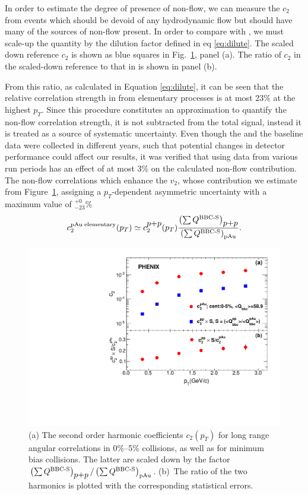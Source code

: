 In order to estimate the degree of presence of non-flow, we can measure the $c_2$ from \pp events which should be devoid of any hydrodynamic flow but should have many of the sources of non-flow present. In order to compare \pp with \pau, we must scale-up the \pp quantity by the dilution factor defined in eq \ref{eq:dilute}.
The scaled down reference $c_{2}$ is shown as blue squares in Fig.~\ref{fig:non_flow}, panel (a). The ratio of $c_2$ in the scaled-down \pp reference to that in \pau is shown in panel (b). 

From this ratio, as calculated in Equation \ref{eq:dilute}, it can be seen that the relative correlation strength in \pau from elementary processes is at most 23$\%$ at the highest $p_T$. Since this procedure constitutes an approximation to quantify the non-flow correlation strength, it is not subtracted from the total signal, instead it is treated as a source of systematic uncertainty. Even though the \pau and the \pp baseline data were collected in different years, such that potential changes in detector performance could affect our results, it was verified that using \pp data from various run periods has an effect of at most 3$\%$ on the calculated non-flow contribution. The non-flow correlations which enhance the $v_2$, whose contribution we estimate from Figure~\ref{fig:non_flow}, assigning a $p_T$-dependent asymmetric uncertainty with a maximum value of $^{+0}_{-23}\%$
\begin{equation}
c_{2}^{{\rm pAu \; elementary}}(p_{T}) \simeq c_{2}^{\mbox{$p$+$p$}}(p_{T})
\frac{\left( \sum Q^{{\rm \text{BBC-S}}} \right)_{\mbox{$p$+$p$}}}
{\left( \sum Q^{{\rm \text{BBC-S}}} \right)_{{\rm pAu}}}.
\label{eq:dilute}
\end{equation}

\begin{figure}[!h]
\begin{center}
\includegraphics[width=0.6\linewidth]{figs/non_flow.pdf}
\caption{(a) The second order harmonic coefficients $c_2(p_T)$ for long range angular correlations in
0\%--5\% \pau collisions, as well as for minimum bias \pp collisions. The latter are scaled down by the factor $\left( \sum Q^{{\rm \text{BBC-S}}} \right)_{\mbox{$p$+$p$}} / \left( \sum Q^{{\rm
\text{BBC-S}}} \right)_{{\rm pAu}}$. (b)~The
ratio of the two harmonics is plotted with the corresponding statistical errors.}
\label{fig:non_flow}
\end{center}
\end{figure}

